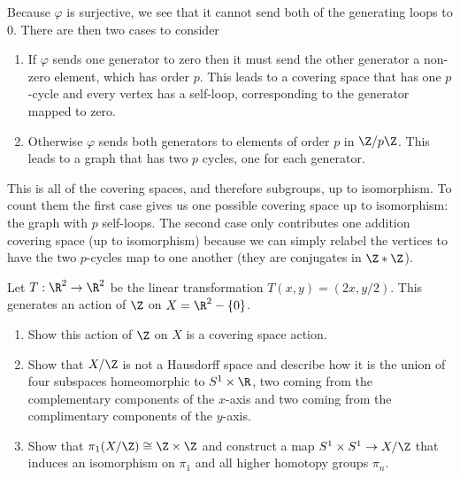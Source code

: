 \documentclass{article}
\begin{document}
\begin{solution}{0cm}
\begin{enumerate}
    Because $\varphi$ is surjective, we see that it cannot send both
    of the generating loops to 0. There are then two cases to consider
    \begin{enumerate}
    \item If $\varphi$ sends one generator to zero then it must send
      the other generator a non-zero element, which has order
      $p$. This leads to a covering space that has one $p$-cycle and
      every vertex has a self-loop, corresponding to the generator
      mapped to zero.
    \item Otherwise $\varphi$ sends both generators to elements of
      order $p$ in $\Z/p\Z$. This leads to a graph that has two $p$
      cycles, one for each generator.
    \end{enumerate}
    This is all of the covering spaces, and therefore subgroups, up to
    isomorphism. To count them the first case gives us one possible
    covering space up to isomorphism: the graph with $p$
    self-loops. The second case only contributes one addition covering
    space (up to isomorphism) because we can simply relabel the
    vertices to have the two $p$-cycles map to one another (they are
    conjugates in $\Z \ast \Z$).
  \end{enumerate}
\end{solution}

\begin{problem}{5}{\parindent}
  \medskip
  Let $T: \R^2 \to \R^2$ be the linear transformation $T(x,y) =
  (2x,y/2)$. This generates an action of $\Z$ on $X = \R^2 - \{0\}$.
  \begin{enumerate}
  \item Show this action of $\Z$ on $X$ is a covering space action.
  \item Show that $X/\Z$ is not a Hausdorff space and describe how it
    is the union of four subspaces homeomorphic to $S^1 \times \R$,
    two coming from the complementary components of the $x$-axis and
    two coming from the complimentary components of the $y$-axis.
  \item Show that $\pi_1(X/\Z) \cong \Z \times \Z$ and construct a map
    $S^1 \times S^1 \to X/\Z$ that induces an isomorphism on $\pi_1$
    and all higher homotopy groups $\pi_n$.
  \end{enumerate}
\end{problem}
\end{document}
